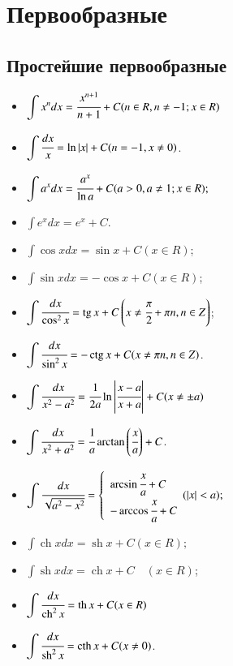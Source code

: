 \documentclass[twoside, a4paperpt, fleqn]{extarticle}
\begin{document}
\section{Первообразные}

\subsection*{Простейшие первообразные}

\begin{multicols}{2}
    \begin{itemize}
        \item $\displaystyle \int x^{n} d x=\cfrac{x^{n+1}}{n+1}+C(n \in R, n \neq-1 ; x \in R)$
        \item $\displaystyle \int \cfrac{d x}{x}=\ln |x|+C(n=-1, x \neq 0)$.
        \item $\displaystyle \int a^{x} d x=\cfrac{a^{x}}{\ln a}+C(a>0, a \neq 1 ; x \in R) ; $
        \item $\displaystyle \int e^{x} d x=e^{x}+C$.
        \item $\displaystyle \int \cos x d x=\sin x+C(x \in R)$;
        \item $\displaystyle \int \sin x d x=-\cos x+C(x \in R)$;
        \item $\displaystyle \int \cfrac{d x}{\cos ^{2} x}=\operatorname{tg} x+C\left(x \neq \cfrac{\pi}{2}+\pi n, n \in Z\right)$;
        \item $\displaystyle \int \cfrac{d x}{\sin ^{2} x}=-\operatorname{ctg} x+C(x \neq \pi n, n \in Z)$.
        \item $\displaystyle \int \cfrac{d x}{x^{2}-a^{2}}=\cfrac{1}{2 a} \ln \left|\cfrac{x-a}{x+a}\right|+C(x \neq \pm a)$
        \item $\displaystyle \int \cfrac{d x}{x^{2}+a^{2}}=\cfrac{1}{a} \arctan \left(\cfrac{x}{a}\right)+C$.
        \item $\displaystyle \int \cfrac{d x}{\sqrt{a^{2}-x^{2}}}=\left\{\begin{array}{l}\arcsin \cfrac{x}{a}+C \\ -\arccos \cfrac{x}{a}+C\end{array}(|x|<a) ;\right.$ 
        \item $\displaystyle \int \operatorname{ch} x d x=\operatorname{sh} x+C(x \in R) ; \quad$
        \item $\displaystyle \int \operatorname{sh} x d x=\operatorname{ch} x+C \quad(x \in R)$;
        \item $\displaystyle \int \cfrac{d x}{\operatorname{ch}^{2} x}=\operatorname{th} x+C(x \in R)$
        \item $\displaystyle \int \cfrac{d x}{\operatorname{sh}^{2} x}=\operatorname{cth} x+C(x \neq 0)$.
    \end{itemize}
\end{multicols}
\end{document}
